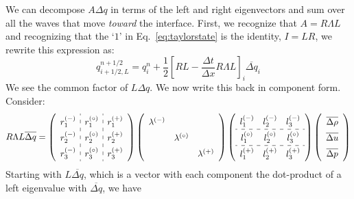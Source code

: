 We can decompose $A \Delta q$ in terms of the left and right
eigenvectors and sum over all the waves that move {\em toward} the
interface.  First, we recognize that $A = R \Lambda L$ and recognizing
that the `$1$'
in Eq.~\ref{eq:taylorstate} is the identity, $I = LR$, we rewrite this
expression as:
\begin{equation}
q_{i+1/2,L}^{n+1/2} = q_i^n + 
     \frac{1}{2} \left [ RL - \frac{\Delta t}{\Delta x} R\Lambda L \right ]_i \overline{\Delta q}_i
\end{equation}
We see the common factor of $L \Delta q$.  We now write this back in
component form.  Consider:
\begin{equation}
\renewcommand{\arraystretch}{1.5}
R\Lambda L \overline{\Delta q} =
   \left ( \begin{array}{c:c:c}
             r_1^\evm & r_1^\evz & r_1^\evp \\
             r_2^\evm & r_2^\evz & r_2^\evp \\
             r_3^\evm & r_3^\evz & r_3^\evp \end{array} \right )
   \left ( \begin{array}{ccc}
             \lambda^\evm &              & \\
                          & \lambda^\evz & \\
                          &              & \lambda^\evp \end{array} \right )
   \left ( \begin{array}{ccc}
             l_1^\evm & l_2^\evm & l_3^\evm \\
             \hdashline 
             l_1^\evz & l_2^\evz & l_3^\evz \\
             \hdashline
             l_1^\evp & l_2^\evp & l_3^\evp \end{array} \right )
   \left ( \begin{array}{c}
            \overline{\Delta \rho} \\
            \overline{\Delta u} \\
            \overline{\Delta p} \end{array} \right )
\renewcommand{\arraystretch}{1.0}
\end{equation}
Starting with $L \overline{\Delta q}$, which is a vector with each component
the dot-product of a left eigenvalue with $\overline{\Delta q}$, we have
